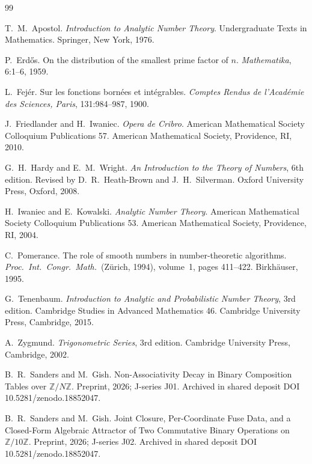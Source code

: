 \documentclass[11pt,reqno]{amsart}
\theoremstyle{plain}
\theoremstyle{definition}
\theoremstyle{remark}
\begin{document}
\begin{thebibliography}{99}

T.~M.~Apostol.
\newblock \emph{Introduction to Analytic Number Theory}.
\newblock Undergraduate Texts in Mathematics. Springer, New York, 1976.

P.~Erd\H{o}s.
\newblock On the distribution of the smallest prime factor of $n$.
\newblock \emph{Mathematika}, 6:1--6, 1959.

L.~Fej\'{e}r.
\newblock Sur les fonctions born\'{e}es et int\'{e}grables.
\newblock \emph{Comptes Rendus de l'Acad\'{e}mie des Sciences, Paris},
131:984--987, 1900.

J.~Friedlander and H.~Iwaniec.
\newblock \emph{Opera de Cribro}.
\newblock American Mathematical Society Colloquium Publications 57.
\newblock American Mathematical Society, Providence, RI, 2010.

G.~H.~Hardy and E.~M.~Wright.
\newblock \emph{An Introduction to the Theory of Numbers}, 6th edition.
\newblock Revised by D.~R.~Heath-Brown and J.~H.~Silverman.
\newblock Oxford University Press, Oxford, 2008.

H.~Iwaniec and E.~Kowalski.
\newblock \emph{Analytic Number Theory}.
\newblock American Mathematical Society Colloquium Publications 53.
\newblock American Mathematical Society, Providence, RI, 2004.

C.~Pomerance.
\newblock The role of smooth numbers in number-theoretic algorithms.
\newblock \emph{Proc.\ Int.\ Congr.\ Math.}\ (Z\"{u}rich, 1994),
volume~1, pages 411--422. Birkh\"{a}user, 1995.

G.~Tenenbaum.
\newblock \emph{Introduction to Analytic and Probabilistic Number Theory},
3rd edition.
\newblock Cambridge Studies in Advanced Mathematics 46. Cambridge
University Press, Cambridge, 2015.

A.~Zygmund.
\newblock \emph{Trigonometric Series}, 3rd edition.
\newblock Cambridge University Press, Cambridge, 2002.

B.~R.~Sanders and M.~Gish.
\newblock Non-Associativity Decay in Binary Composition Tables over
$\mathbb{Z}/N\mathbb{Z}$.
\newblock Preprint, 2026; J-series J01.
\newblock Archived in shared deposit DOI 10.5281/zenodo.18852047.

B.~R.~Sanders and M.~Gish.
\newblock Joint Closure, Per-Coordinate Fuse Data, and a Closed-Form
Algebraic Attractor of Two Commutative Binary Operations on
$\mathbb{Z}/10\mathbb{Z}$.
\newblock Preprint, 2026; J-series J02.
\newblock Archived in shared deposit DOI 10.5281/zenodo.18852047.

\end{thebibliography}
\end{document}

